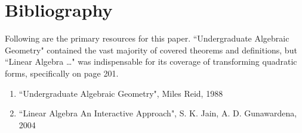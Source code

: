 \section{Bibliography}
Following are the primary resources for this paper. ``Undergraduate Algebraic Geometry"
contained the vast majority of covered theorems and definitions, but ``Linear Algebra \dots"
was indispensable for its coverage of transforming quadratic forms, specifically
on page 201.
\begin{enumerate}
\item ``Undergraduate Algebraic Geometry", Miles Reid, 1988
\item ``Linear Algebra An Interactive Approach", S. K. Jain, A. D. Gunawardena, 2004
\end{enumerate}
